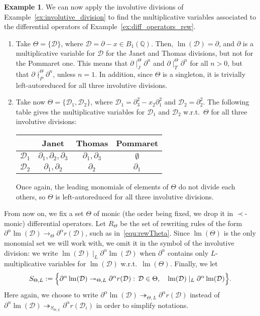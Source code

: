 \documentclass[11pt]{article}
\theoremstyle{definition}
\newtheorem{example}[theorem]{Example}
\newcommand\D{\mathcal{D}}
\DeclareMathOperator{\lm}{lm}
\newcommand\Q{\mathbb{Q}}
\newcommand\Weyl[1]{B_{#1}(\Q)}
\newcommand\parTheta[1]{\twoheadrightarrow_{\Theta,#1}}
\newcommand\rewTheta{\to_\Theta}
\newcommand\divInv[1]{\mid_{#1}}
\newcommand\RTheta{R_{\Theta}}
\newcommand\SThetaL{S_{\Theta,L}}
\begin{document}
\begin{example}\label{ex:multiplicative_variables}
  We can now apply the involutive divisions of 
  Example~\ref{ex:involutive_division} to find the multiplicative
  variables associated to the differential operators of
  Example~\ref{ex:diff_operators_rew}.
  \begin{enumerate}
  \item Take $\Theta = \{\D\}$, where $\D = \partial - x \in \Weyl 1$.
    Then, $\lm(\D) =\partial$, and $\partial$ is a multiplicative
    variable for $\D$ for the Janet and Thomas divisions, but not for the
    Pommaret one. This means that $\partial \divInv{J}^\Theta \partial^n$
    and $\partial \divInv{T}^\Theta \partial^n$ for all $n > 0$, but that
    $\partial \nmid_P^\Theta \partial^n$, unless $n = 1$. In addition,
    since $\Theta$ is a singleton, it is trivially left-autoreduced for
    all three involutive divisions. 
  \item Take now $\Theta = \{\D_1,\D_2\}$, where
    $\D_1=\partial_3^2 - x_2\partial_1^2$ and $\D_2 = \partial_2^2$. The
    following table gives the multiplicative variables for $\D_1$ and
    $\D_2$ w.r.t.\ $\Theta$ for all three involutive divisions:
    \begin{center}
    \begin{tabular}{l|ccc}
      & Janet & Thomas & Pommaret \\ \hline
      $\D_1$ & $\partial_1, \partial_2, \partial_3$ & $\partial_1, \partial_3$ & $\emptyset$ \\
      $\D_2$ & $\partial_1, \partial_2$ & $\partial_2$ & $\partial_1$ \\
    \end{tabular}
  \end{center}
    Once again, the leading monomials of elements of $\Theta$ do not divide
    each others, so $\Theta$ is left-autoreduced for all three involutive
    divisions.
  \end{enumerate}
\end{example}
\smallskip


From now on, we fix a set $\Theta$ of monic (the order being fixed, we
drop it in $\prec$-monic) differential operators. Let $\RTheta$  be the
set of rewriting rules of the form
$\partial^\alpha\lm(\D)\rewTheta\partial^\alpha r(\D)$, such as
in~\eqref{equ:rewTheta}. Since $\lm(\Theta)$ is the only monomial set we
will work with, we omit it in the symbol of the involutive division: we
write $\lm(\D)\divInv{L}\partial^\alpha\lm(\D)$ when $\partial^\alpha$
contains only $L$-multiplicative variables for $\lm(\D)$ w.r.t.\
$\lm(\Theta)$. Finally, we let
\begin{equation}\label{equ:S-strategy}
  \SThetaL:=\Big\{\partial^\alpha\lm(\D)\parTheta{L}\partial^\alpha
  r(\D) : \, \D\in\Theta,\quad\lm(\D)\divInv{L}\partial^\alpha\lm(\D)
  \Big\}.
  \smallskip
\end{equation}
Here again, we choose to write
$\partial^\alpha\lm(\D)\parTheta{L}\partial^\alpha r(\D)$ instead of
$\partial^\alpha\lm(\D)\twoheadrightarrow_{\SThetaL}\partial^\alpha
r(\D_i)$ in order to simplify notations.
\smallskip
\end{document}
